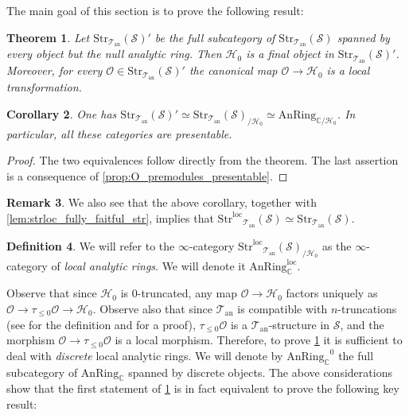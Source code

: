 \documentclass[12pt,a4paper,reqno]{amsart}
\theoremstyle{plain}
\newtheorem{thm}{Theorem}[section]
\newtheorem{cor}[thm]{Corollary}
\theoremstyle{definition}
\newtheorem{defin}[thm]{Definition}
\newtheorem{rem}[thm]{Remark}
\theoremstyle{remark}
\numberwithin{equation}{section}
\begin{document}
The main goal of this section is to prove the following result:

\begin{thm} \label{thm:local_analytic_rings_augmented}
	Let ${\mathrm{Str}}_{{\mathcal T}_{\mathrm{an}}}({\mathcal S})'$ be the full subcategory of ${\mathrm{Str}}_{{\mathcal T}_{\mathrm{an}}}({\mathcal S})$ spanned by every object but the null analytic ring.
	Then ${\mathcal H}_0$ is a final object in ${\mathrm{Str}}_{{\mathcal T}_{\mathrm{an}}}({\mathcal S})'$. Moreover, for every ${\mathcal O} \in {\mathrm{Str}}_{{\mathcal T}_{\mathrm{an}}}({\mathcal S})'$ the canonical map ${\mathcal O} \to {\mathcal H}_0$ is a local transformation.
\end{thm}

\begin{cor} \label{cor:Strloc_Tan_presentable}
	One has ${\mathrm{Str}}_{{\mathcal T}_{\mathrm{an}}}({\mathcal S})' \simeq {\mathrm{Str}}_{{\mathcal T}_{\mathrm{an}}}({\mathcal S})_{/{\mathcal H}_0} \simeq \mathrm{AnRing}_{\mathbb C/{\mathcal H}_0}$.
	In particular, all these categories are presentable.
\end{cor}

\begin{proof}
	The two equivalences follow directly from the theorem. The last assertion is a consequence of \cref{prop:O_premodules_presentable}.
\end{proof}

\begin{rem}
	We also see that the above corollary, together with \cref{lem:strloc_fully_faitful_str}, implies that ${\mathrm{Str}^\mathrm{loc}}_{{\mathcal T}_{\mathrm{an}}}({\mathcal S}) \simeq {\mathrm{Str}}_{{\mathcal T}_{\mathrm{an}}}({\mathcal S})$.
\end{rem}

\begin{defin} \label{def:local_analytic_ring}
	We will refer to the $\infty$-category ${\mathrm{Str}^\mathrm{loc}}_{{\mathcal T}_{\mathrm{an}}}({\mathcal S})_{/{\mathcal H}_0}$ as the $\infty$-category of \emph{local analytic rings}.
	We will denote it ${\mathrm{AnRing}^{\mathrm{loc}}_{\mathbb C}}$.
\end{defin}

Observe that since ${\mathcal H}_0$ is $0$-truncated, any map ${\mathcal O} \to {\mathcal H}_0$ factors uniquely as ${\mathcal O} \to \tau_{\le 0} {\mathcal O} \to {\mathcal H}_0$.
Observe also that since ${{\mathcal T}_{\mathrm{an}}}$ is compatible with $n$-truncations (see \cite[Definition 3.3.2]{DAG-V} for the definition and \cite[Proposition 11.4]{DAG-IX} for a proof), $\tau_{\le 0} {\mathcal O}$ is a ${{\mathcal T}_{\mathrm{an}}}$-structure in ${\mathcal S}$, and the morphism ${\mathcal O} \to \tau_{\le 0} {\mathcal O}$ is a local morphism.
Therefore, to prove \cref{thm:local_analytic_rings_augmented} it is sufficient to deal with \emph{discrete} local analytic rings.
We will denote by ${\mathrm{AnRing}_{\mathbb C}}^0$ the full subcategory of ${\mathrm{AnRing}_{\mathbb C}}$ spanned by discrete objects.
The above considerations show that the first statement of \cref{thm:local_analytic_rings_augmented} is in fact equivalent to prove the following key result:
\end{document}
